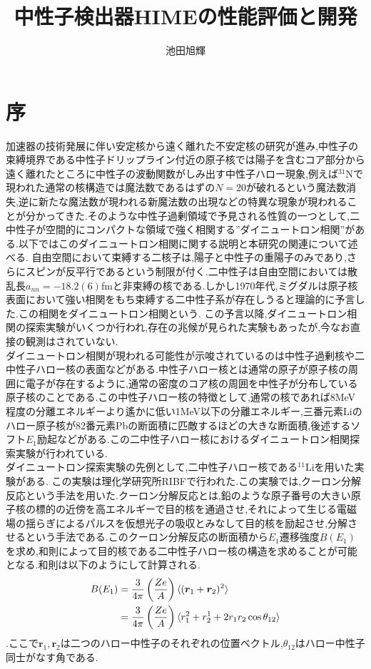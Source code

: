 \documentclass[dvipdfmx]{jsreport}
\begin{document}
\title{中性子検出器HIMEの性能評価と開発}
\author{池田旭輝}
\maketitle
\tableofcontents
\clearpage

\chapter{序}
加速器の技術発展に伴い安定核から遠く離れた不安定核の研究が進み,中性子の束縛境界である中性子ドリップライン付近の原子核では陽子を含むコア部分から遠く離れたところに中性子の波動関数がしみ出す中性子ハロー現象,例えば$^{31}\mathrm{N}$で現われた通常の核構造では魔法数であるはずの$N=20$が破れるという魔法数消失,逆に新たな魔法数が現われる新魔法数の出現などの特異な現象が現われることが分かってきた.そのような中性子過剰領域で予見される性質の一つとして,二中性子が空間的にコンパクトな領域で強く相関する''ダイニュートロン相関''がある.以下ではこのダイニュートロン相関に関する説明と本研究の関連について述べる.
自由空間において束縛する二核子は,陽子と中性子の重陽子のみであり,さらにスピンが反平行であるという制限が付く.二中性子は自由空間においては散乱長$a_{nn}=-18.2(6)$fmと非束縛の核である.しかし1970年代,ミグダルは原子核表面において強い相関をもち束縛する二中性子系が存在しうると理論的に予言した.この相関をダイニュートロン相関という.
この予言以降,ダイニュートロン相関の探索実験がいくつか行われ,存在の兆候が見られた実験もあったが,今なお直接の観測はされていない.
\\
ダイニュートロン相関が現われる可能性が示唆されているのは中性子過剰核や二中性子ハロー核の表面などがある.中性子ハロー核とは通常の原子が原子核の周囲に電子が存在するように,通常の密度のコア核の周囲を中性子が分布している原子核のことである.この中性子ハロー核の特徴として,通常の核であれば8MeV程度の分離エネルギーより遙かに低い1MeV以下の分離エネルギー,三番元素Liのハロー原子核が82番元素Pbの断面積に匹敵するほどの大きな断面積,後述するソフト$E_1$励起などがある.この二中性子ハロー核におけるダイニュートロン相関探索実験が行われている.
\\
ダイニュートロン探索実験の先例として,二中性子ハロー核である$^11$Liを用いた実験がある.
この実験は理化学研究所RIBFで行われた.この実験では,クーロン分解反応という手法を用いた.クーロン分解反応とは,鉛のような原子番号の大きい原子核の標的の近傍を高エネルギーで目的核を通過させ,それによって生じる電磁場の揺らぎによるパルスを仮想光子の吸収とみなして目的核を励起させ,分解させるという手法である.このクーロン分解反応の断面積から$E_1$遷移強度$B(E_1)$を求め,和則によって目的核である二中性子ハロー核の構造を求めることが可能となる.和則は以下のようにして計算される.\begin{align}B(E_1)&=\frac{3}{4\pi}\left(\frac{Ze}{A}\right)\braket{(\bm{r}_1+\bm{r}_2)^2}\\&=\frac{3}{4\pi}\left(\frac{Ze}{A}\right)\braket{r_1^2+r_2^1+2r_1r_2\cos{\theta}_{12}}\end{align}.ここで$\bm{r}_1,\bm{r}_2$は二つのハロー中性子のそれぞれの位置ベクトル,$\theta_{12}$はハロー中性子同士がなす角である.
\end{document}

